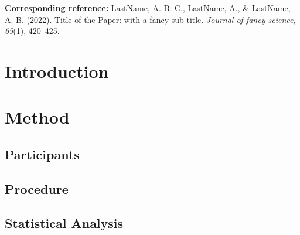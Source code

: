\begin{refsection}
\vspace*{\fill}
\begin{remark}
\textbf{Corresponding reference:} LastName, A. B. C., LastName, A., \& LastName, A. B. (2022). Title of the Paper: with a fancy sub-title. \textit{Journal of fancy science, 69}(1), 420–425.
\end{remark}




\newpage
\AddLabels
\section{Introduction}

\vspace{-0.5em}

\newpage
\vspace{-1em}

\section{Method}

\subsection*{Participants}
\vspace{-0.25cm}


\vspace{-0.25cm}
\subsection*{Procedure}
\vspace{-0.25cm}


\vspace{-0.5cm}
\subsection*{Statistical Analysis}
\vspace{-0.25cm}




\newpage


\end{refsection}
